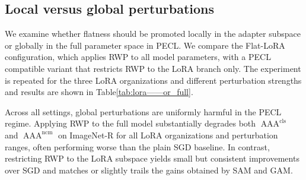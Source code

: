 \documentclass{article}
\theoremstyle{plain}
\theoremstyle{definition}
\theoremstyle{remark}
\begin{document}




\subsection{Local versus global perturbations}
\label{sec:results-local-global}



We examine whether flatness should be promoted locally in the adapter subspace or globally in the full parameter space in PECL. 
We compare the Flat-LoRA configuration, which applies RWP to all model parameters, with a PECL compatible
variant that restricts RWP to the LoRA branch only. The experiment is repeated for the three LoRA organizations and different perturbation strengths and results are shown in Table\ref{tab:lora——or_full}.


Across all settings, global perturbations are uniformly harmful in the PECL regime. 
Applying RWP to the full model substantially degrades both $\operatorname{AAA}^{\mathrm{cls}}$ and $\operatorname{AAA}^{\mathrm{ncm}}$ on ImageNet-R for all LoRA organizations and perturbation ranges, often performing worse than the plain SGD baseline. 
In contrast, restricting RWP to the LoRA subspace yields small but consistent improvements over SGD and matches or slightly trails the gains obtained by SAM and GAM.
\end{document}

